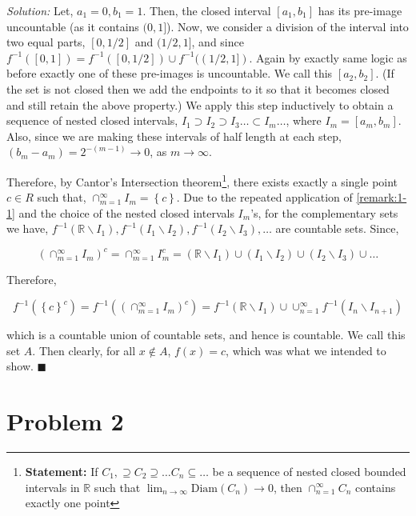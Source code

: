 \documentclass[12pt]{article}
\newcommand{\R}{\mathbb{R}}
\theoremstyle{definition}
\newenvironment{answer}{\textit{Solution: }\quad }{ \hfill $\blacksquare$}
\begin{document}
\begin{answer}
	Let, $a_1 = 0, b_1 = 1$. Then, the closed interval $[a_1, b_1]$ has its pre-image uncountable (as it contains $(0, 1]$). Now, we consider a division of the interval into two equal parts, $[0, 1/2]$ and $(1/2, 1]$, and since $f^{-1}([0, 1]) = f^{-1}([0, 1/2]) \cup f^{-1}((1/2, 1])$. Again by exactly same logic as before exactly one of these pre-images is uncountable. We call this $[a_2, b_2]$. (If the set is not closed then we add the endpoints to it so that it becomes closed and still retain the above property.) We apply this step inductively to obtain a sequence of nested closed intervals, $I_1 \supset I_2 \supset I_3 \dots \subset I_m \dots$, where $I_m = [a_m, b_m]$. Also, since we are making these intervals of half length at each step, $(b_m - a_m) = 2^{-(m-1)} \rightarrow 0$, as $m \rightarrow \infty$. 

	Therefore, by Cantor's Intersection theorem\footnote{\textbf{Statement:} If $C_1, \supseteq C_2 \supseteq \dots C_n \subseteq \dots$ be a sequence of nested closed bounded intervals in $\R$ such that $\lim_{n \rightarrow \infty}\text{Diam}(C_n) \rightarrow 0$, then $\cap_{n=1}^{\infty}C_n$ contains exactly one point}, there exists exactly a single point $c \in R$ such that, $\cap_{m = 1}^{\infty} I_m = \left\{ c \right\}$. Due to the repeated application of \cref{remark:1-1} and the choice of the nested closed intervals $I_m$'s, for the complementary sets we have, $f^{-1}(\R \backslash I_1), f^{-1}(I_1 \backslash I_2), f^{-1}(I_2 \backslash I_3), \dots$ are countable sets. Since,

	$$
	\left(\cap_{m = 1}^{\infty} I_m \right)^c
	= \cap_{m=1}^{\infty} I_m^c
	= (\R \backslash I_1) \cup (I_1 \backslash I_2) \cup (I_2 \backslash I_3) \cup \dots
	$$

	Therefore,

	$$f^{-1}(\left\{ c \right\}^c) = f^{-1}(\left(\cap_{m = 1}^{\infty} I_m \right)^c) = f^{-1}(\R \backslash I_1) \cup \cup_{n = 1}^{\infty} f^{-1}(I_n \backslash I_{n+1})$$

	which is a countable union of countable sets, and hence is countable. We call this set $A$. Then clearly, for all $x \notin A$, $f(x) = c$, which was what we intended to show.
\end{answer}


\pagebreak
\section{Problem 2}
\end{document}
